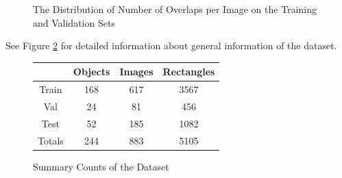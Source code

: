 \documentclass{article}
\begin{document}
\begin{figure}
\centering
{}
\qquad
{}
\caption{The Distribution of Number of Overlaps per Image on the Training and Validation Sets}
\label{fig:overlapdist}
\end{figure}

See Figure \ref{fig:summary} for detailed information about general
information of the dataset.

\begin{figure}
\centering
\begin{tabular}{c|c|c|c|}
&Objects&Images&Rectangles\\
\hline
Train&168&617&3567\\
\hline
Val&24&81&456\\
\hline
Test&52&185&1082\\
\hline
Totals&244&883&5105\\
\hline
\end{tabular}
\caption{Summary Counts of the Dataset}
\label{fig:summary}
\end{figure}
\end{document}
